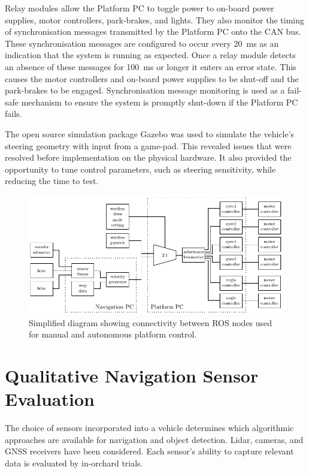 \documentclass[preprint,authoryear,12pt]{elsarticle}
\begin{document}
        Relay modules allow the Platform PC to toggle power to on-board power supplies, motor controllers, park-brakes, and lights.
        They also monitor the timing of synchronisation messages transmitted by the Platform PC onto the CAN bus.
        These synchronisation messages are configured to occur every \SI{20}{\milli\second} as an indication that the system is running as expected.
        Once a relay module detects an absence of these messages for \SI{100}{\milli\second} or longer it enters an error state.
        This causes the motor controllers and on-board power supplies to be shut-off and the park-brakes to be engaged.
        Synchronisation message monitoring is used as a fail-safe mechanism to ensure the system is promptly shut-down if the Platform PC fails.

        The open source simulation package Gazebo was used to simulate the vehicle's steering geometry with input from a game-pad.
        This revealed issues that were resolved before implementation on the physical hardware.
        It also provided the opportunity to tune control parameters, such as steering sensitivity, while reducing the time to test.

        \begin{figure}[htb]
            \centering
            \includegraphics[width=\linewidth]{imgs/system_diagram/software_v2.pdf}
            \caption{Simplified diagram showing connectivity between ROS nodes used for manual and autonomous platform control.}
            \label{fig:system_diagram_software}
        \end{figure}


\section{Qualitative Navigation Sensor Evaluation}
\label{sect:sensors}
    The choice of sensors incorporated into a vehicle determines which algorithmic approaches are available for navigation and object detection.
    Lidar, cameras, and GNSS receivers have been considered.
    Each sensor's ability to capture relevant data is evaluated by in-orchard trials.
\end{document}
